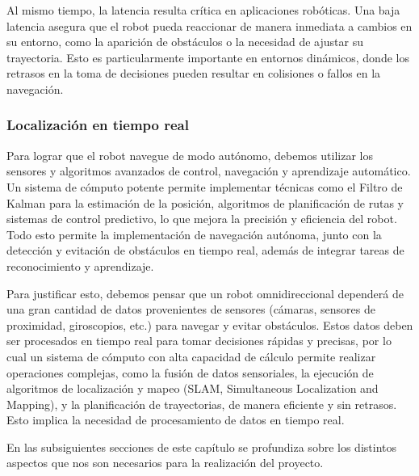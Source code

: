 Al mismo tiempo, la latencia resulta crítica en aplicaciones robóticas. Una baja latencia asegura que el robot pueda reaccionar de manera inmediata a cambios en su entorno, como la aparición de obstáculos o la necesidad de ajustar su trayectoria. Esto es particularmente importante en entornos dinámicos, donde los retrasos en la toma de decisiones pueden resultar en colisiones o fallos en la navegación.


\subsubsection{Localización en tiempo real}

Para lograr que el robot navegue de modo autónomo, debemos utilizar los sensores y algoritmos avanzados de control, navegación y aprendizaje automático. Un sistema de cómputo potente permite implementar técnicas como el Filtro de Kalman para la estimación de la posición, algoritmos de planificación de rutas y sistemas de control predictivo, lo que mejora la precisión y eficiencia del robot. Todo esto permite la implementación de navegación autónoma, junto con la detección y evitación de obstáculos en tiempo real, además de integrar tareas de reconocimiento y aprendizaje.

Para justificar esto, debemos pensar que un robot omnidireccional dependerá de una gran cantidad de datos provenientes de sensores (cámaras, sensores de proximidad, giroscopios, etc.) para navegar y evitar obstáculos. Estos datos deben ser procesados en tiempo real para tomar decisiones rápidas y precisas, por lo cual un sistema de cómputo con alta capacidad de cálculo permite realizar operaciones complejas, como la fusión de datos sensoriales, la ejecución de algoritmos de localización y mapeo (SLAM, Simultaneous Localization and Mapping), y la planificación de trayectorias, de manera eficiente y sin retrasos. Esto implica la necesidad de procesamiento de datos en tiempo real. \cite{sariffpathplan}

En las subsiguientes secciones de este capítulo se profundiza sobre los distintos aspectos que nos son necesarios para la realización del proyecto.
